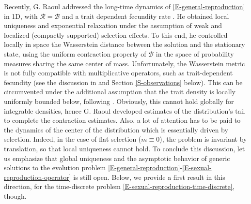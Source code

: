 \documentclass[reqno]{amsart}
\numberwithin{equation}{section}
\begin{document}
{Recently, {\sc G. Raoul} addressed the long-time dynamics of \eqref{E-general-reproduction} in 1D, with $\mathcal{R}=\mathcal{B}$ and a trait dependent fecundity rate \cite{R-21-arxiv}. He obtained local uniqueness and exponential relaxation under the assumption of weak and localized (compactly supported) selection effects. To this end, he controlled locally in space the Wasserstein distance between the solution and the stationary state, using the uniform contraction property of $\mathcal{B}$ in the space of probability measures sharing the same center of mass. Unfortunately, the Wasserstein metric is not fully compatible with multiplicative operators, such as trait-dependent fecundity (see the discussion in \cite[Section 3.4]{R-21-arxiv} and Section \ref{S-observations} below). This can be circumvented under the additional assumption that the trait density is locally uniformly bounded below, following \cite{BGG-12}. Obviously, this cannot hold globally for integrable densities, hence {\sc G. Raoul} developed estimates of the distribution's tail to complete the contraction estimates. Also, a lot of attention has to be paid to the dynamics of the center of the distribution which is essentially driven by selection. Indeed, in the case of flat selection ($m\equiv0$), the problem is invariant by translation, so that local uniqueness cannot hold. To conclude this discussion, let us emphasize that global uniqueness and the  asymptotic behavior of generic solutions to the evolution problem \eqref{E-general-reproduction}-\eqref{E-sexual-reproduction-operator} is still open. Below, we provide a first result in this direction, for the time-discrete problem \eqref{E-sexual-reproduction-time-discrete}, though.

}
\end{document}

